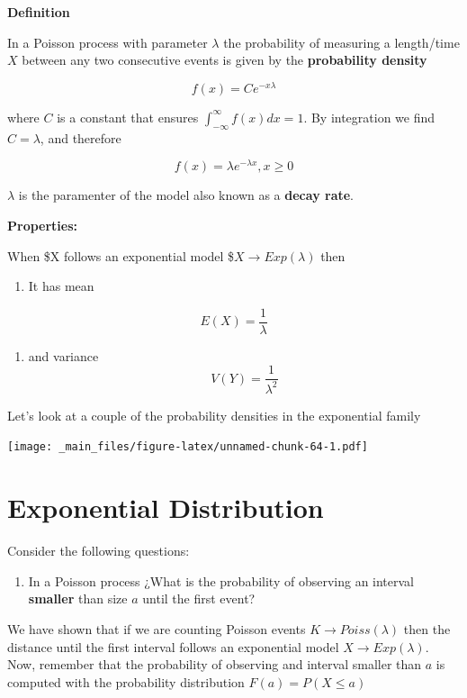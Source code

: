\documentclass[
]{book}
\providecommand{\tightlist}{%
  \setlength{\itemsep}{0pt}\setlength{\parskip}{0pt}}
\begin{document}
\textbf{Definition}

In a Poisson process with parameter \(\lambda\) the probability of measuring a length/time \(X\) between any two consecutive events is given by the \textbf{probability density}

\[f(x)= C e^{-x\lambda}\]

where \(C\) is a constant that ensures \(\int_{-\infty}^{\infty} f(x) dx =1\). By integration we find \(C=\lambda\), and therefore

\[f(x)=\lambda e^{-\lambda x}, x\geq 0\]

\(\lambda\) is the paramenter of the model also known as a \textbf{decay rate}.

\textbf{Properties:}

When \$X follows an exponential model \$\(X \rightarrow Exp(\lambda)\) then

\begin{enumerate}
\def\labelenumi{\arabic{enumi})}
\tightlist
\item
  It has mean
\end{enumerate}

\[E(X)=\frac{1}{\lambda}\]

\begin{enumerate}
\def\labelenumi{\arabic{enumi})}
\setcounter{enumi}{1}
\tightlist
\item
  and variance
  \[V(Y)=\frac{1}{\lambda^2}\]
\end{enumerate}

Let's look at a couple of the probability densities in the exponential family

\texttt{[image: \_main\_files/figure-latex/unnamed-chunk-64-1.pdf]}

\hypertarget{exponential-distribution}{%
\section{Exponential Distribution}\label{exponential-distribution}}

Consider the following questions:

\begin{enumerate}
\def\labelenumi{\arabic{enumi})}
\tightlist
\item
  In a Poisson process ¿What is the probability of observing an interval \textbf{smaller} than size \(a\) until the first event?
\end{enumerate}

We have shown that if we are counting Poisson events \(K \rightarrow Poiss(\lambda)\) then the distance until the first interval follows an exponential model \(X \rightarrow Exp(\lambda)\). Now, remember that the probability of observing and interval smaller than \(a\) is computed with the probability distribution \(F(a)=P(X \leq a)\)
\end{document}
